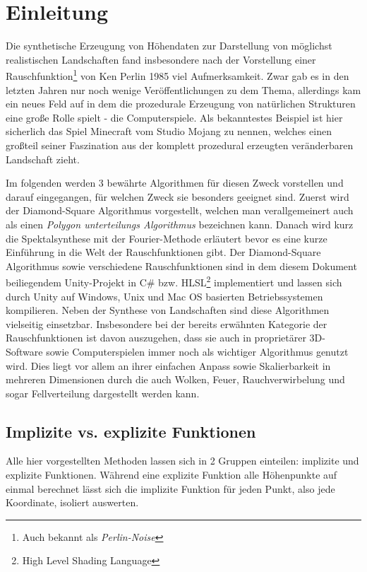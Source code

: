 \chapter{Einleitung}

Die synthetische Erzeugung von Höhendaten zur Darstellung von möglichst realistischen Landschaften fand insbesondere nach der Vorstellung einer Rauschfunktion\footnote{Auch bekannt als \emph{Perlin-Noise}} von Ken Perlin 1985\cite{PERLIN1985} viel Aufmerksamkeit. Zwar gab es in den letzten Jahren nur noch wenige Veröffentlichungen zu dem Thema, allerdings kam ein neues Feld auf in dem die prozedurale Erzeugung von natürlichen Strukturen eine große Rolle spielt - die Computerspiele.
Als bekanntestes Beispiel ist hier sicherlich das Spiel Minecraft vom Studio Mojang zu nennen, welches einen großteil seiner Faszination aus der komplett prozedural erzeugten veränderbaren Landschaft zieht.

Im folgenden werden 3 bewährte Algorithmen für diesen Zweck vorstellen und darauf eingegangen, für welchen Zweck sie besonders geeignet sind.
Zuerst wird der Diamond-Square Algorithmus\cite{DiamondSquare} vorgestellt, welchen man verallgemeinert auch als einen \emph{Polygon unterteilungs Algorithmus} bezeichnen kann. Danach wird kurz die Spektalsynthese mit der Fourier-Methode erläutert bevor es eine kurze Einführung in die Welt der Rauschfunktionen gibt. 
Der Diamond-Square Algorithmus sowie verschiedene Rauschfunktionen sind in dem diesem Dokument beiliegendem Unity-Projekt in C\# bzw. HLSL\footnote{High Level Shading Language} implementiert und lassen sich durch Unity auf Windows, Unix und Mac OS basierten Betriebssystemen kompilieren.
Neben der Synthese von Landschaften sind diese Algorithmen vielseitig einsetzbar. Insbesondere bei der bereits erwähnten Kategorie der Rauschfunktionen ist davon auszugehen, dass sie auch in proprietärer 3D-Software sowie Computerspielen immer noch als wichtiger Algorithmus genutzt wird. Dies liegt vor allem an ihrer einfachen Anpass sowie Skalierbarkeit in mehreren Dimensionen durch die auch Wolken, Feuer, Rauchverwirbelung und sogar Fellverteilung dargestellt werden kann\cite{texturingAndModeling}.

\section{Implizite vs. explizite Funktionen}
Alle hier vorgestellten Methoden lassen sich in 2 Gruppen einteilen: implizite und explizite Funktionen.
Während eine explizite Funktion alle Höhenpunkte auf einmal berechnet lässt sich die implizite Funktion für jeden Punkt, also jede Koordinate, isoliert auswerten. 

